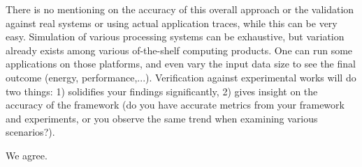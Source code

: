 \begin{reviewer}
There is no mentioning on the accuracy of this overall approach or the
validation against real systems or using actual application traces, while this
can be very easy. Simulation of various processing systems can be exhaustive,
but variation already exists among various of-the-shelf computing products. One
can run some applications on those platforms, and even vary the input data size
to see the final outcome (energy, performance,...). Verification against
experimental works will do two things: 1) solidifies your findings
significantly, 2) gives insight on the accuracy of the framework (do you have
accurate metrics from your framework and experiments, or you observe the same
trend when examining various scenarios?).
\end{reviewer}

\begin{authors}
We agree.

\begin{actions}
\end{actions}
\end{authors}

